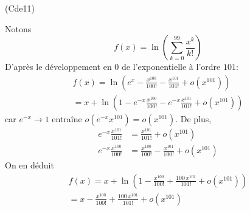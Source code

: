\begin{tiny}(Cde11)\end{tiny} Notons 
\begin{displaymath}
 f(x)= \ln\left( \sum_{k=0}^{99}\frac{x^k}{k!}\right)
\end{displaymath}
D'après le développement en $0$ de l'exponentielle à l'ordre $101$:
\begin{multline*}
 f(x)=\ln\left(e^x -\frac{x^{100}}{100!}-\frac{x^{101}}{101!} +o(x^{101})\right) \\
= x+\ln\left(1 -e^{-x}\frac{x^{100}}{100!}-e^{-x}\frac{x^{101}}{101!} +o(x^{101})\right)
\end{multline*}
car $e^{-x}\rightarrow 1$ entraîne $o(e^{-x}x^{101})=o(x^{101})$. De plus,
\begin{align*}
 e^{-x}\frac{x^{101}}{101!}&= \frac{x^{101}}{101!} +o(x^{101})\\
 e^{-x}\frac{x^{100}}{100!}&= \frac{x^{100}}{100!}-\frac{x^{101}}{100!} +o(x^{101})
\end{align*}
On en déduit
\begin{multline*}
 f(x)=x+\ln\left(1- \frac{x^{100}}{100!}+\frac{100\,x^{101}}{101!}+o(x^{101})\right)\\
 = x - \frac{x^{100}}{100!}+\frac{100\,x^{101}}{101!}+o(x^{101})
\end{multline*}
